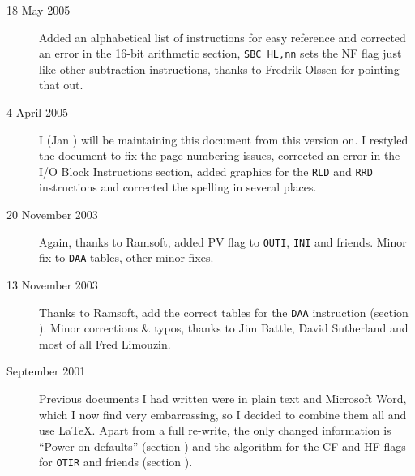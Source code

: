 \begin{description}
	\item[18 May 2005]
	Added an alphabetical list of instructions for easy reference and corrected an error in the 16-bit arithmetic section, {\tt SBC HL,nn} sets the NF flag just like other subtraction instructions, thanks to Fredrik Olssen for pointing that out.

	\item[4 April 2005]
	I (Jan ) will be maintaining this document from this version on. I restyled the document to fix the page numbering issues, corrected an error in the I/O Block Instructions section, added graphics for the {\tt RLD} and {\tt RRD} instructions and corrected the spelling in several places.

	\item[20 November 2003]
	Again, thanks to Ramsoft, added PV flag to {\tt OUTI}, {\tt INI} and friends. Minor fix to {\tt DAA} tables, other minor fixes.

	\item[13 November 2003]
	Thanks to Ramsoft, add the correct tables for the {\tt DAA} instruction (section ). Minor corrections \& typos, thanks to Jim Battle, David Sutherland and most of all Fred Limouzin.

	\item[September 2001]
	Previous documents I had written were in plain text and Microsoft Word, which I now find very embarrassing, so I decided to combine them all and use {\LaTeX}. Apart from a full re-write, the only changed information is ``Power on defaults'' (section ) and the algorithm for the CF and HF flags for {\tt OTIR} and friends (section ).

\end{description}


\pagebreak
\IntentionallyEmpty
\pagebreak
